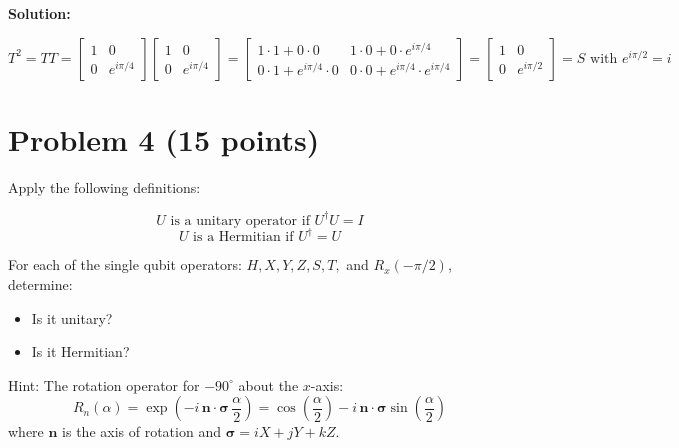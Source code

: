 \documentclass[11pt]{article}
\newenvironment{solution}
{\par\noindent\textbf{Solution:}\par}
{\vspace{1em}}
\begin{document}
\begin{solution}
\[
T^2 = TT = \begin{bmatrix}1&0\\0&e^{i\pi/4}\end{bmatrix} \begin{bmatrix}1&0\\0&e^{i\pi/4}\end{bmatrix} = \begin{bmatrix}1 \cdot 1 + 0 \cdot 0&1 \cdot 0 + 0 \cdot e^{i\pi/4}\\0 \cdot 1 + e^{i\pi/4} \cdot 0&0 \cdot 0 + e^{i\pi/4} \cdot e^{i\pi/4}\end{bmatrix} = \begin{bmatrix}1&0\\0&e^{i\pi/2}\end{bmatrix} = \boxed{S} \text{ with } e^{i\pi/2} = i
\]

\end{solution}

\section*{Problem 4 (15 points)}
Apply the following definitions:

\[
U \text{ is a unitary operator if } U^\dagger U = I
\]
\[
U \text{ is a Hermitian if } U^\dagger = U
\]

For each of the single qubit operators: $H, X, Y, Z, S, T,$ and $R_x(-\pi/2)$, determine:

\begin{itemize}
\item Is it unitary?
\item Is it Hermitian?
\end{itemize}

Hint: The rotation operator for $-90^\circ$ about the $x$-axis:
\[
R_n(\alpha)=\exp\left(-i\,\mathbf{n}\cdot\boldsymbol{\sigma}\,\frac{\alpha}{2}\right)
=\cos\left(\frac{\alpha}{2}\right)-i\,\mathbf{n}\cdot\boldsymbol{\sigma}\sin\left(\frac{\alpha}{2}\right)
\]
where $\mathbf{n}$ is the axis of rotation and $\boldsymbol{\sigma}=iX + jY + kZ$.
\end{document}
